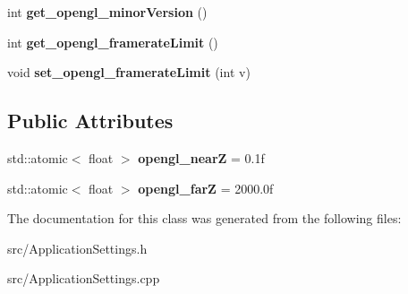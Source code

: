 \begin{DoxyCompactItemize}
\mbox{\label{classdarksun_1_1_application_settings_ade428792e54f92af0c016fc00b68ff0e}} 
int {\bfseries get\+\_\+opengl\+\_\+minor\+Version} ()
\item 
\mbox{\label{classdarksun_1_1_application_settings_a48fe370dcb60080e92830df466f7f8fe}} 
int {\bfseries get\+\_\+opengl\+\_\+framerate\+Limit} ()
\item 
\mbox{\label{classdarksun_1_1_application_settings_a321197ba5738c06746194a90581321fc}} 
void {\bfseries set\+\_\+opengl\+\_\+framerate\+Limit} (int v)
\end{DoxyCompactItemize}
\subsection*{Public Attributes}
\begin{DoxyCompactItemize}
\item 
\mbox{\label{classdarksun_1_1_application_settings_ae681c79eb7808291baaa24816ed57e3a}} 
std\+::atomic$<$ float $>$ {\bfseries opengl\+\_\+nearZ} = 0.\+1f
\item 
\mbox{\label{classdarksun_1_1_application_settings_a94490c83abe1f33f861c69cd90b80e44}} 
std\+::atomic$<$ float $>$ {\bfseries opengl\+\_\+farZ} = 2000.\+0f
\end{DoxyCompactItemize}


The documentation for this class was generated from the following files\+:\begin{DoxyCompactItemize}
\item 
src/Application\+Settings.\+h\item 
src/Application\+Settings.\+cpp\end{DoxyCompactItemize}

